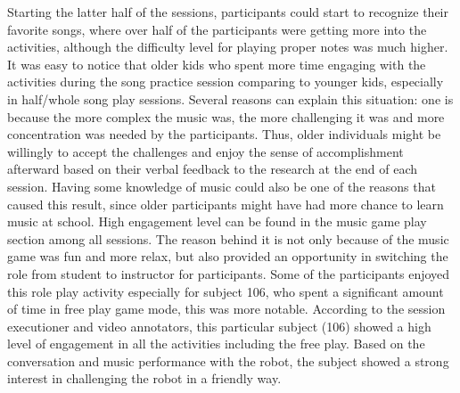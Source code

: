 Starting the latter half of the sessions, participants could start to recognize their favorite songs,
where over half of the participants were getting more into the activities, although the difficulty level for
playing proper notes was much higher. It was easy to notice that older kids who spent more time engaging with the activities 
during the song practice session comparing to younger kids, especially in half/whole song play sessions.
Several reasons can explain this situation: one is because the more complex the music was,
the more challenging it was and more concentration was needed by the participants. Thus, older individuals might be willingly to accept the challenges and enjoy the sense of accomplishment afterward based on their verbal feedback to the research at the end of  
each session. Having some knowledge of music could also be one of the reasons that caused this result, 
since older participants might have had more chance to learn music at school. High engagement level can be 
found in the music game play section among all sessions. The reason behind it is not only because of the 
music game was fun and more relax, but also provided an opportunity in switching the role from student to instructor
for participants. Some of the participants enjoyed this role play activity 
especially for subject 106, who spent a significant amount of time in free play 
game mode, this was more notable. According to the session executioner and video annotators, this particular subject (106) showed 
a high level of engagement in all the activities including the free play. Based on the conversation 
and music performance with the robot, the subject showed a strong interest in challenging the robot 
in a friendly way. \\

